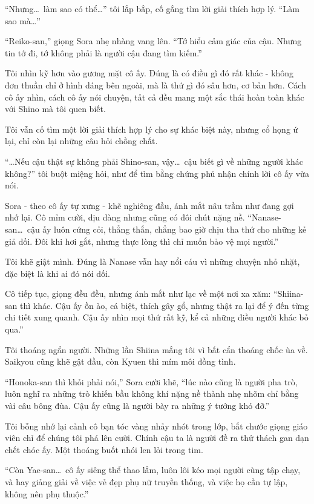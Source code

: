 \documentclass[../main.tex]{subfiles}
\begin{document}
``Nhưng\dots\ làm sao có thể\dots'' tôi lắp bắp, cố gắng tìm lời giải thích hợp lý. ``Làm sao mà\dots''

``Reiko-san,'' giọng Sora nhẹ nhàng vang lên. ``Tớ hiểu cảm giác của cậu. Nhưng tin tớ đi, tớ không phải là người cậu đang tìm kiếm.''

Tôi nhìn kỹ hơn vào gương mặt cô ấy. Đúng là có điều gì đó rất khác - không đơn thuần chỉ ở hình dáng bên ngoài, mà là thứ gì đó sâu hơn, cơ bản hơn. Cách cô ấy nhìn, cách cô ấy nói chuyện, tất cả đều mang một sắc thái hoàn toàn khác với Shino mà tôi quen biết.

Tôi vẫn cố tìm một lời giải thích hợp lý cho sự khác biệt này, nhưng cổ họng ứ lại, chỉ còn lại những câu hỏi chồng chất.

``\dots Nếu cậu thật sự không phải Shino-san, vậy\dots\ cậu biết gì về những người khác không?'' tôi buột miệng hỏi, như để tìm bằng chứng phủ nhận chính lời cô ấy vừa nói.

Sora - theo cô ấy tự xưng - khẽ nghiêng đầu, ánh mắt nâu trầm như đang gợi nhớ lại. Cô mỉm cười, dịu dàng nhưng cũng có đôi chút nặng nề. ``Nanase-san\dots\ cậu ấy luôn cứng cỏi, thẳng thắn, chẳng bao giờ chịu tha thứ cho những kẻ giả dối. Đôi khi hơi gắt, nhưng thực lòng thì chỉ muốn bảo vệ mọi người.''

Tôi khẽ giật mình. Đúng là Nanase vẫn hay nổi cáu vì những chuyện nhỏ nhặt, đặc biệt là khi ai đó nói dối.

Cô tiếp tục, giọng đều đều, nhưng ánh mắt như lạc về một nơi xa xăm: ``Shiina-san thì khác. Cậu ấy ồn ào, cá biệt, thích gây gổ, nhưng thật ra lại để ý đến từng chi tiết xung quanh. Cậu ấy nhìn mọi thứ rất kỹ, kể cả những điều người khác bỏ qua.''

Tôi thoáng ngẩn người. Những lần Shiina mắng tôi vì bất cẩn thoáng chốc ùa về. Saikyou cũng khẽ gật đầu, còn Kyuen thì mím môi đồng tình.

``Honoka-san thì khỏi phải nói,'' Sora cười khẽ, ``lúc nào cũng là người pha trò, luôn nghĩ ra những trò khiến bầu không khí nặng nề thành nhẹ nhõm chỉ bằng vài câu bông đùa. Cậu ấy cũng là người bày ra những ý tưởng khó đỡ.''

Tôi bỗng nhớ lại cảnh cô bạn tóc vàng nhảy nhót trong lớp, bắt chước giọng giáo viên chỉ để chúng tôi phá lên cười. Chính cậu ta là người đề ra thử thách gan dạn chết chóc ấy. Một thoáng buốt nhói len lỏi trong tim.

``Còn Yae-san\dots\ cô ấy siêng thể thao lắm, luôn lôi kéo mọi người cùng tập chạy, và hay giảng giải về việc vẻ đẹp phụ nữ truyền thống, và việc họ cần tự lập, không nên phụ thuộc.''
\end{document}
